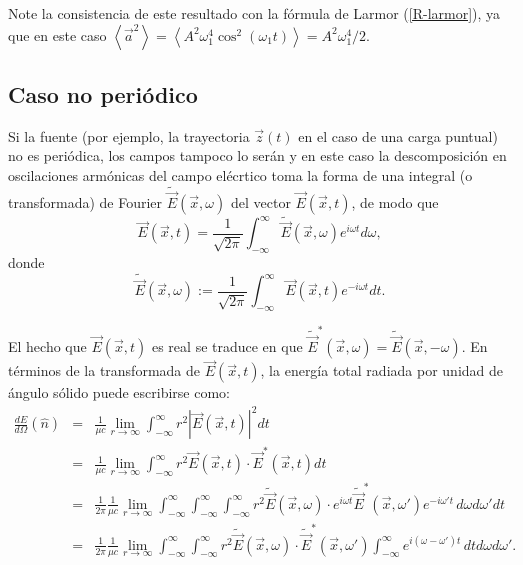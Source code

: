 Note la consistencia de este resultado con la fórmula de Larmor (\ref{R-larmor}), ya que en este caso $\left\langle\vec{a}^2\right\rangle=\left\langle A^2\omega_1^4\cos^2(\omega_1t)\right\rangle=A^2\omega_1^4/2$.


\subsection{Caso no periódico}

Si la fuente (por ejemplo, la trayectoria $\vec{z}(t)$ en el caso de una carga puntual) no es periódica, los campos tampoco lo serán y en este caso la descomposición en oscilaciones armónicas del campo elécrtico toma la forma de una integral (o transformada) de Fourier $\tilde{\vec{E}}(\vec{x},\omega)$ del vector $\vec{E}(\vec{x},t)$, de modo que
\begin{equation}
 \vec{E}(\vec{x},t)=\frac{1}{\sqrt{2\pi}}\int_{-\infty}^{\infty}\tilde{\vec{E}}(\vec{x},\omega) e^{i\omega t}d\omega ,
\end{equation}
donde
\begin{equation}
\tilde{\vec{E}}(\vec{x},\omega) :=\frac{1}{\sqrt{2\pi}}\int_{-\infty}^{\infty}\vec{E}(\vec{x},t) e^{-i\omega t}dt .  \label{dp3}
\end{equation}

El hecho que $\vec{E}(\vec{x},t)$ es real se traduce en que 
$\tilde{\vec{E}}^*(\vec{x},\omega)=\tilde{\vec{E}}(\vec{x},-\omega)$. En términos de la transformada de $\vec{E}(\vec{x},t)$, la energía total radiada por unidad de ángulo sólido puede escribirse como:
\begin{eqnarray}
\frac{dE}{d\Omega}(\hat{n}) &=&\frac{1}{\mu c}\lim_{r\to\infty} \int_{-\infty}^{\infty}r^2\left|\vec{E}(\vec{x},t)
\right|^2dt \label{dEdO0}\\
&=&\frac{1}{\mu c}\lim_{r\to\infty}\int_{-\infty}^{\infty}r^2\vec{E}(\vec{x},t)\cdot \vec{E}^*(\vec{x},t)dt\\
&=&\frac{1}{2\pi}\frac{1}{\mu c}\lim_{r\to\infty}\int_{-\infty}^{\infty}\int_{-\infty}^{\infty}\int_{-\infty}^{
\infty}r^2\tilde{\vec{E}}(\vec{x},\omega) \cdot e^{i\omega t}\tilde{\vec{E}}^\ast(\vec{x},\omega')e^{-i\omega' t}\,d\omega d\omega' dt\\
&=&\frac{1}{2\pi}\frac{1}{\mu c}\lim_{r\to\infty} \int_{-\infty}^{\infty}\int_{-\infty}^{\infty}r^2\tilde{\vec{E}}(\vec{x},\omega)\cdot \tilde{\vec{E}}^*(\vec{x},\omega')\int_{-\infty}^{\infty} e^{i(\omega-\omega')t}\,dtd\omega d\omega' .
\end{eqnarray}

